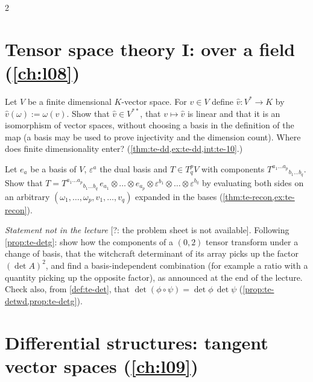 \begin{paracol}{2}
\section{Tensor space theory I: over a field (\cref{ch:l08})}\label{exam:ch08}

\begin{exercise}\label{ex:te-dd-full}
Let $V$ be a finite dimensional $K$-vector space. For $v\in V$ define $\hat v\colon V^*\to K$ by $\hat v(\omega):=\omega(v)$. Show that $\hat v\in V^{**}$, that $v\mapsto\hat v$ is linear and that it is an isomorphism of vector spaces, without choosing a basis in the definition of the map (a basis may be used to prove
injectivity and the dimension count). Where does finite dimensionality enter? (\cref{thm:te-dd,ex:te-dd,int:te-10}.)
\end{exercise}

\begin{exercise}\label{ex:te-recon-full}
Let $e_a$ be a basis of $V$, $\varepsilon^a$ the dual basis and $T\in T^p_qV$ with components $T^{a_1\dots a_p}{}_{b_1\dots b_q}$. Show that $T=T^{a_1\dots a_p}{}_{b_1\dots b_q}\,e_{a_1}\otimes\dots\otimes e_{a_p}\otimes\varepsilon^{b_1}\otimes\dots\otimes\varepsilon^{b_q}$ by evaluating both sides on
an arbitrary $(\omega_1,\dots,\omega_p,v_1,\dots,v_q)$ expanded in the bases (\cref{thm:te-recon,ex:te-recon}).
\end{exercise}

\begin{exercise}\label{ex:te-detg-full}
\emph{Statement not in the lecture} [?: the problem sheet is not available]. Following \cref{prop:te-detg}: show how the components of a $(0,2)$ tensor transform under a change of basis, that the witchcraft determinant of its array picks up the factor $(\det A)^2$, and find a basis-independent combination (for example a ratio with a
quantity picking up the opposite factor), as announced at the end of the lecture. Check also, from \cref{def:te-det}, that $\det(\phi\circ\psi)=\det\phi\,\det\psi$ (\cref{prop:te-detwd,prop:te-detg}).
\end{exercise}

\section{Differential structures: tangent vector spaces (\cref{ch:l09})}\label{exam:ch09}


\end{paracol}
